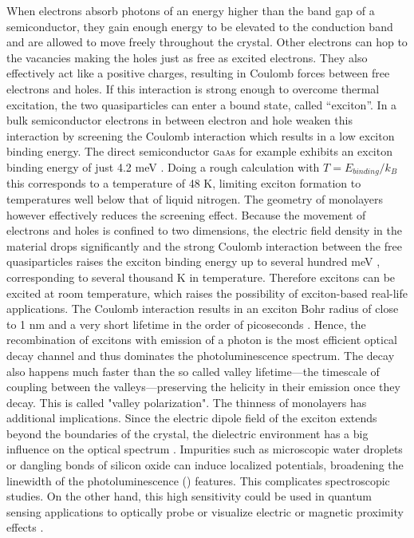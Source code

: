 When electrons absorb photons of an energy higher than the band gap of a semiconductor, they gain enough energy to be elevated to the conduction band and are allowed to move freely throughout the crystal. Other electrons can hop to the vacancies making the holes just as free as excited electrons. They also effectively act like a positive charges, resulting in Coulomb forces between free electrons and holes. If this interaction is strong enough to overcome thermal excitation, the two quasiparticles can enter a bound state, called ``exciton''. In a bulk semiconductor electrons in between electron and hole weaken this interaction by screening the Coulomb interaction which results in a low exciton binding energy. The direct semiconductor \textsc{g}a\textsc{a}s for example exhibits an exciton binding energy of just 4.2 meV \cite{pelant_luminescence_2012}. Doing a rough calculation with $T=E_{binding}/k_B$ this corresponds to a temperature of 48 K, limiting exciton formation to temperatures well below that of liquid nitrogen.
The geometry of \tmdg monolayers however effectively reduces the screening effect. Because the movement of electrons and holes is confined to two dimensions, the electric field density in the material drops significantly and the strong Coulomb interaction between the free quasiparticles raises the exciton binding energy up to several hundred meV \cite{chernikov_exciton_2014, hanbicki_measurement_2015, he_tightly_2014}, corresponding to several thousand K in temperature. Therefore excitons can be excited at room temperature, which raises the possibility of exciton-based real-life applications. The Coulomb interaction results in an exciton Bohr radius of close to 1 nm and a very short lifetime in the order of picoseconds \cite{palummo_exciton_2015}. Hence, the recombination of excitons with emission of a photon is the most efficient optical decay channel and thus dominates the photoluminescence spectrum.
The decay also happens much faster than the so called valley lifetime---the timescale of coupling between the valleys---preserving the helicity in their emission once they decay. This is called "valley polarization".
The thinness of \tmdg monolayers has additional implications. Since the electric dipole field of the exciton extends beyond the boundaries of the crystal, the dielectric environment has a big influence on the optical spectrum \cite{stier_probing_2016, borghardt_engineering_2017, jakubczyk_impact_2018}. Impurities such as microscopic water droplets or dangling bonds of silicon oxide can induce localized potentials, broadening the linewidth of the photoluminescence (\pl\!) features. This complicates spectroscopic studies. On the other hand, this high sensitivity could be used in quantum sensing applications to optically probe or visualize electric or magnetic proximity effects \cite{peng_valley_2017, zhao_enhanced_2017, smolenski_tuning_2016, neumann_opto-valleytronic_2017}.


